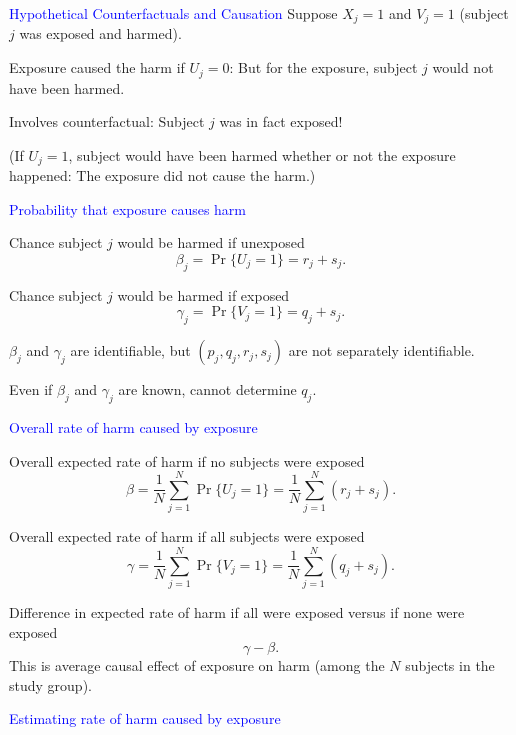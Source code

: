 \documentclass[landscape]{slides}
\newcommand{\beq}{\begin{equation}}
\newcommand{\eeq}{\end{equation}}
\begin{document}
\begin{slide}
\begin{slide}{\textcolor{blue}{Hypothetical Counterfactuals and Causation}}
Suppose $X_j = 1$ and $V_j = 1$ (subject $j$ was exposed and harmed).

Exposure caused the harm if $U_j = 0$:  But for the exposure, subject $j$
would not have been harmed.  

Involves counterfactual: Subject $j$ was in fact exposed!

(If $U_j = 1$, subject would have been harmed whether or not the exposure
happened: The exposure did not cause the harm.)

\end{slide}

\begin{slide}{\textcolor{blue}{Probability that exposure causes harm}}

Chance subject $j$ would be harmed if unexposed
\beq
   \beta_j = \Pr \{U_j = 1 \} = r_j + s_j.
\eeq


Chance subject $j$ would be harmed if exposed
\beq
      \gamma_j = \Pr \{ V_j = 1 \} = q_j + s_j.
\eeq

$\beta_j$ and $\gamma_j$ are identifiable, but
$(p_j, q_j, r_j, s_j)$ are not separately identifiable.

Even if $\beta_j$ and $\gamma_j$ are known, cannot determine $q_j$.


\end{slide}

\begin{slide}{\textcolor{blue}{Overall rate of harm caused by exposure}}

Overall expected rate of harm if no subjects were exposed
\beq
   \beta = \frac{1}{N} \sum_{j=1}^N \Pr \{ U_j = 1 \} = \frac{1}{N} \sum_{j=1}^N (r_j + s_j).
\eeq

Overall expected rate of harm if all subjects were exposed
\beq
   \gamma = \frac{1}{N} \sum_{j=1}^N \Pr \{ V_j = 1 \} = \frac{1}{N} \sum_{j=1}^N (q_j + s_j).
\eeq

Difference in expected rate of harm if all were exposed versus if none were exposed
\beq
   \gamma - \beta.
\eeq
This is average causal effect of exposure on harm 
(among the $N$ subjects in the study group).

\end{slide}

\begin{slide}{\textcolor{blue}{Estimating rate of harm caused by exposure}}


\end{slide}
\end{slide}
\end{document}
